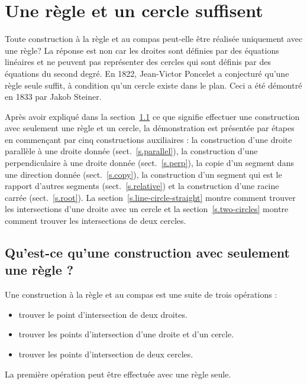 \chapter{Une règle et un cercle suffisent}\label{c.straightedge}



Toute construction à la règle et au  compas peut-elle être réalisée uniquement avec une règle? La réponse est non car les droites sont définies par des équations linéaires et ne peuvent pas représenter des cercles qui sont définis par des équations du second degré. En 1822, Jean-Victor Poncelet a conjecturé qu'une règle seule suffit, à condition qu'un cercle existe dans le plan. Ceci a été démontré en 1833 par Jakob Steiner.

Après avoir expliqué dans la section~\ref{s.se-what} ce que signifie effectuer une construction avec seulement une règle et un cercle, la démonstration est présentée par étapes en commençant par cinq constructions auxiliaires : la construction d'une droite parallèle à une droite donnée (sect.~\ref{s.parallel}), la construction d'une perpendiculaire à une droite donnée (sect.~\ref{s.perp}), la copie d'un segment  dans une direction donnée (sect.~\ref{s.copy}), la construction d'un segment  qui est le rapport d'autres segments (sect.~\ref{s.relative}) et la construction d'une racine carrée (sect.~\ref{s.root}). La section~\ref{s.line-circle-straight} montre comment trouver  les intersections d'une droite avec un cercle et la section~\ref{s.two-circles} montre comment trouver  les intersections de deux cercles.

\section{Qu'est-ce qu'une construction avec seulement une règle ?}\label{s.se-what}
Une construction à la règle et au  compas est une suite de trois opérations :
\begin{itemize}
\item trouver le point d'intersection de deux droites.
\item trouver  les points d'intersection d'une droite et d'un cercle.
\item trouver  les points d'intersection de deux cercles.
\end{itemize}
La première opération peut être effectuée avec une règle seule.


